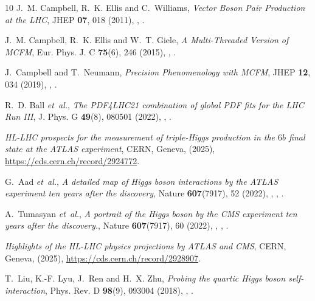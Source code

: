 \documentclass{SciPost}
\begin{document}
\begin{thebibliography}{10}
J.~M. Campbell, R.~K. Ellis and C.~Williams,
\newblock \emph{{Vector Boson Pair Production at the LHC}},
\newblock JHEP \textbf{07}, 018 (2011),
\newblock {},
\newblock {}.

J.~M. Campbell, R.~K. Ellis and W.~T. Giele,
\newblock \emph{{A Multi-Threaded Version of MCFM}},
\newblock Eur. Phys. J. C \textbf{75}(6), 246 (2015),
\newblock {},
\newblock {}.

J.~Campbell and T.~Neumann,
\newblock \emph{{Precision Phenomenology with MCFM}},
\newblock JHEP \textbf{12}, 034 (2019),
\newblock {},
\newblock {}.

R.~D. Ball \emph{et~al.},
\newblock \emph{{The PDF4LHC21 combination of global PDF fits for the LHC Run III}},
\newblock J. Phys. G \textbf{49}(8), 080501 (2022),
\newblock {},
\newblock {}.

\emph{{HL-LHC prospects for the measurement of triple-Higgs production in the $6b$ final state at the ATLAS experiment}},
\newblock CERN, Geneva, (2025),
\newblock \href{https://cds.cern.ch/record/2924772}{https://cds.cern.ch/record/2924772}.

G.~Aad \emph{et~al.},
\newblock \emph{{A detailed map of Higgs boson interactions by the ATLAS experiment ten years after the discovery}},
\newblock Nature \textbf{607}(7917), 52 (2022),
\newblock {},
,
\newblock {}.

A.~Tumasyan \emph{et~al.},
\newblock \emph{{A portrait of the Higgs boson by the CMS experiment ten years after the discovery.}},
\newblock Nature \textbf{607}(7917), 60 (2022),
\newblock {},
,
\newblock {}.

\emph{{Highlights of the HL-LHC physics projections by ATLAS and CMS}},
\newblock CERN, Geneva, (2025),
\newblock \href{https://cds.cern.ch/record/2928907}{https://cds.cern.ch/record/2928907}.

T.~Liu, K.-F. Lyu, J.~Ren and H.~X. Zhu,
\newblock \emph{{Probing the quartic Higgs boson self-interaction}},
\newblock Phys. Rev. D \textbf{98}(9), 093004 (2018),
\newblock {},
\newblock {}.


\end{thebibliography}
\end{document}
